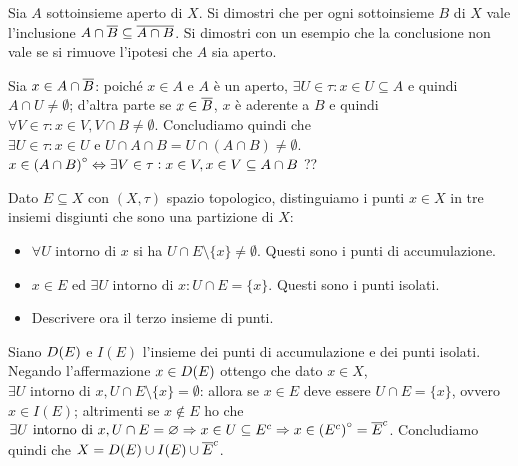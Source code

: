 \begin{es}
  Sia $ A $ sottoinsieme aperto di $ X $. Si dimostri che per ogni sottoinsieme $ B $ di $ X $ vale l'inclusione $ A \cap \overline{B} \subseteq \overline{A \cap B} $. Si dimostri con un esempio che la conclusione non vale se si rimuove l'ipotesi che $ A $ sia aperto.
\end{es}
%
Sia $ x \in A \cap \overline{B} $: poiché $ x \in A $ e $ A $ è un aperto, $ \exists U \in \tau : x \in U \subseteq A $ e quindi $ A \cap U \neq \emptyset $; d'altra parte se $ x \in \overline{B} $, $ x $ è aderente a $ B $ e quindi $ \forall V \in \tau : x \in V, V \cap B \neq \emptyset $. Concludiamo quindi che $ \exists U \in \tau : x \in U \text{ e } U \cap A \cap B = U \cap (A \cap B) \neq \emptyset $. \\
$ x \in {(A \cap B)}^{\circ} \Leftrightarrow \exists V \in \tau : x \in V, x \in V \subseteq A \cap B $
??

\begin{es}
  Dato $ E \subseteq X $ con $ (X, \tau) $ spazio topologico, distinguiamo i punti $ x \in X $ in tre insiemi disgiunti che sono una partizione di $ X $:
  \begin{itemize}
  \item $ \forall U \text{ intorno di } x $ si ha $ U \cap E \setminus \{x\} \neq \emptyset $. Questi sono i punti di accumulazione.
  \item $ x \in E $ ed $ \exists U \text{ intorno di } x : U \cap E = \{x\} $. Questi sono i punti isolati.
  \item Descrivere ora il terzo insieme di punti.
  \end{itemize}
\end{es}
%
Siano $ D{(E)} $ e $ I(E) $ l'insieme dei punti di accumulazione e dei punti isolati. Negando l'affermazione $ x \in D{(E)} $ ottengo che dato $ x \in X $, $ \exists U \text{ intorno di } x, U \cap E \setminus \{x\} =\emptyset $: allora se $ x \in E $ deve essere $ U \cap E = \{x\} $, ovvero $ x \in I(E) $; altrimenti se $ x \notin E $ ho che $ \exists U \text{ intorno di } x, U \cap E =\varnothing \Rightarrow x \in U \subseteq E^c \Rightarrow x \in {(E^c)}^{\circ} = \overline{E}^c $. Concludiamo quindi che $ X = D{(E)} \cup I(E) \cup \overline{E}^c $.

